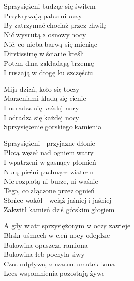 \begin{text}
    \ifchorded{\hfill\break}
    Sprzysiężeni budząc się świtem\\
    Przykrywają palcami oczy\\
    By zatrzymać chociaż przez chwilę\\
    Nić wysnutą z osnowy nocy\\
    Nić, co nieba barwą się mieniąc\\
    Diretissimę w ścianie kreśli\\
    Potem dnia zakładają brzemię\\
    I ruszają w drogę ku szczęściu

    \vin Mija dzień, koło się toczy\\
    \vin Marzeniami kładą się cienie\\
    \vin I odradza się każdej nocy\\
    \vin I odradza się każdej nocy\\
    \vin Sprzysiężenie górskiego kamienia

    Sprzysiężeni - przyjazne dłonie\\
    Plotą węzeł nad ogniem watry\\
    I wpatrzeni w gasnący płomień\\
    Nucą pieśni pachnące wiatrem\\
    Nie rozplotą ni burze, ni waśnie\\
    Tego, co złączone przez ognień\\
    Słońce wokół - wciąż jaśniej i jaśniej\\
    Zakwitł kamień dziś górskim głogiem

    A gdy wiatr sprzysiężonym w oczy zawieje\\
    Bliski uśmiech w cień nocy odejdzie\\
    Bukowina opuszcza ramiona\\
    Bukowina łeb pochyla siwy\\
    Czas odpływa, z czasem smutek kona\\
    Lecz wspomnienia pozostają żywe
\end{text}
